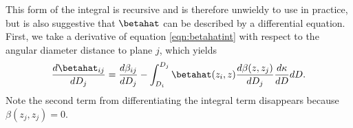 This form of the integral is recursive and is therefore unwieldy to use in practice, but is also suggestive that $\betahat$ can be described by a differential equation. First, we take a derivative of equation \ref{eqn:betahatint} with respect to the angular diameter distance to plane $j$, which yields
\begin{equation}
\frac{d\betahat_{i j}}{d D_j} = \frac{d\beta_{i j}}{d D_j} - \int_{D_i}^{D_j} \betahat(z_i, z) \frac{d \beta(z, z_j)}{d D_j} \frac{d \kappa}{d D} d D.
\end{equation}
Note the second term from differentiating the integral term disappears because $\beta(z_j, z_j) = 0$. 
  